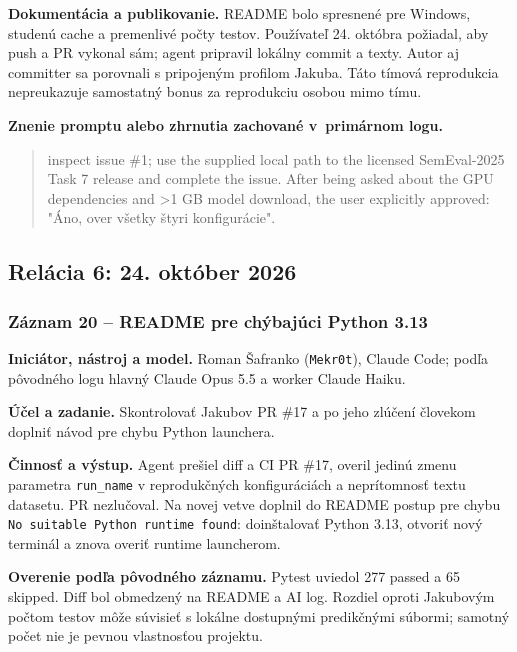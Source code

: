 \par\noindent \textbf{Dokumentácia a publikovanie.} README bolo spresnené pre Windows, studenú cache a premenlivé počty testov. Používateľ 24. októbra požiadal, aby push a PR vykonal sám; agent pripravil lokálny commit a texty. Autor aj committer sa porovnali s pripojeným profilom Jakuba. Táto tímová reprodukcia nepreukazuje samostatný bonus za reprodukciu osobou mimo tímu.\par\smallskip

\par\noindent\textbf{Znenie promptu alebo zhrnutia zachované v~primárnom logu.}

\begin{quote}\normalsize inspect issue \#1; use the supplied local path to the licensed SemEval-2025 Task 7 release and complete the issue. After being asked about the GPU dependencies and >1 GB model download, the user explicitly approved: "Áno, over všetky štyri konfigurácie".\end{quote}

\subsection*{Relácia 6: 24. október 2026}

\subsubsection*{Záznam 20 -- README pre chýbajúci Python 3.13}


\par\noindent \textbf{Iniciátor, nástroj a model.} Roman Šafranko (\texttt{Mekr0t}), Claude Code; podľa pôvodného logu hlavný Claude Opus 5.5 a worker Claude Haiku.\par\smallskip
\par\noindent \textbf{Účel a zadanie.} Skontrolovať Jakubov PR \#17 a po jeho zlúčení človekom doplniť návod pre chybu Python launchera.\par\smallskip
\par\noindent \textbf{Činnosť a výstup.} Agent prešiel diff a CI PR \#17, overil jedinú zmenu parametra \texttt{run\_\allowbreak{}name} v reprodukčných konfiguráciách a neprítomnosť textu datasetu. PR nezlučoval. Na novej vetve doplnil do README postup pre chybu \texttt{No \allowbreak{}suitable \allowbreak{}Python \allowbreak{}runtime \allowbreak{}found}: doinštalovať Python 3.13, otvoriť nový terminál a znova overiť runtime launcherom.\par\smallskip
\par\noindent \textbf{Overenie podľa pôvodného záznamu.} Pytest uviedol 277 passed a 65 skipped. Diff bol obmedzený na README a AI log. Rozdiel oproti Jakubovým počtom testov môže súvisieť s lokálne dostupnými predikčnými súbormi; samotný počet nie je pevnou vlastnosťou projektu.\par\smallskip

